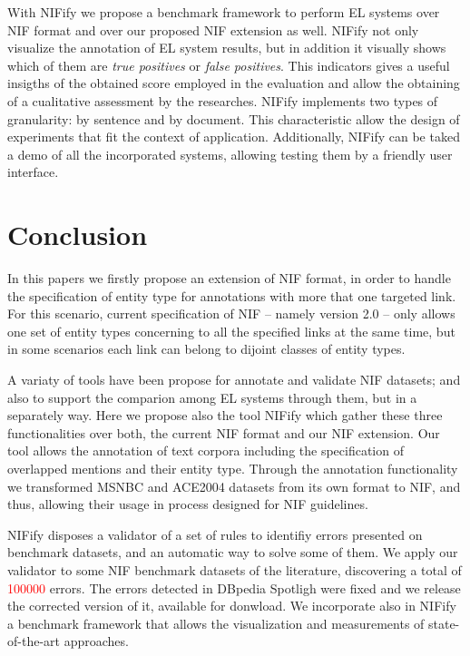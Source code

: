 \documentclass{llncs}
\begin{document}
With NIFify we propose a benchmark framework to perform EL systems over NIF format and over our proposed NIF extension as well. NIFify not only visualize the annotation of EL system results, but in addition it visually shows which of them are \textit{true positives} or \textit{false positives}. This indicators gives a useful insigths of the obtained score employed in the evaluation and allow the obtaining of a cualitative assessment by the researches. NIFify implements two types of granularity: by sentence and by document. This characteristic allow the design of experiments that fit the context of application. Additionally, NIFify can be taked a demo of all the incorporated systems, allowing testing them by a friendly user interface.


\section{Conclusion} 
\label{sec:conclusion}
In this papers we firstly propose an extension of NIF format, in order to handle the specification of entity type for annotations with more that one targeted link. For this scenario, current specification of NIF -- namely version 2.0 -- only allows one set of entity types concerning to all the specified links at the same time, but in some scenarios each link can belong to dijoint classes of entity types. 

A variaty of tools have been propose for annotate and validate NIF datasets; and also to support the comparion among EL systems through them, but in a separately way. Here we propose also the tool NIFify which gather these three functionalities over both, the current NIF format and our NIF extension. Our tool allows the annotation of text corpora including the specification of overlapped mentions and their entity type. Through the annotation functionality we transformed MSNBC and ACE2004 datasets from its own format to NIF, and thus, allowing their usage in process designed for NIF guidelines.

NIFify disposes a validator of a set of rules to identifiy errors presented on benchmark datasets, and an automatic way to solve some of them. We apply our validator to some NIF benchmark datasets of the literature, discovering a total of \textcolor{red}{100000} errors. The errors detected in DBpedia Spotligh were fixed and we release the corrected version of it, available for donwload. We incorporate also in NIFify a benchmark framework that allows the visualization and measurements of state-of-the-art approaches.
\end{document}
